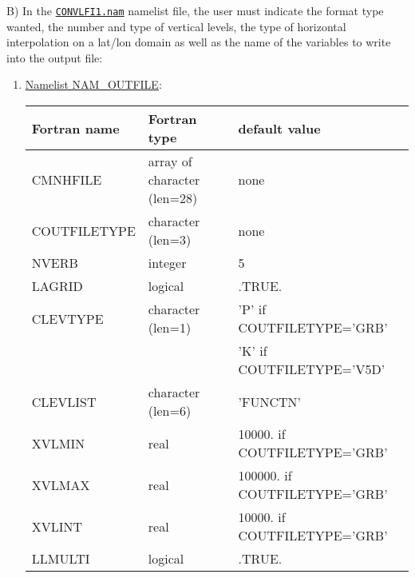 B) In the \underline{\tt CONVLFI1.nam} namelist file, the user must indicate
the format type wanted, the number and type of vertical levels, 
the type of horizontal interpolation on a lat/lon domain 
as well as the name of the variables to write into the output file:
\begin{enumerate}
\item\underline{Namelist NAM\_OUTFILE}: 

\begin{center}
\begin{tabular} {|l|l|l|}
\hline
Fortran name & Fortran type & default value\\
\hline
\hline
CMNHFILE     & array of character (len=28)  & none   \\
COUTFILETYPE & character (len=3)   & none   \\
NVERB        & integer    & 5  \\
LAGRID       & logical    & .TRUE.  \\
CLEVTYPE     & character (len=1)   & 'P' if COUTFILETYPE='GRB'   \\
             &                     & 'K' if COUTFILETYPE='V5D'   \\
CLEVLIST     & character (len=6)   & 'FUNCTN'   \\
XVLMIN       & real    & 10000.  if COUTFILETYPE='GRB'  \\
XVLMAX       & real    & 100000. if COUTFILETYPE='GRB'  \\
XVLINT       & real    & 10000.  if COUTFILETYPE='GRB'  \\
LLMULTI      & logical    & .TRUE. \\
\hline
\end{tabular}
\end{center}


\end{enumerate}
